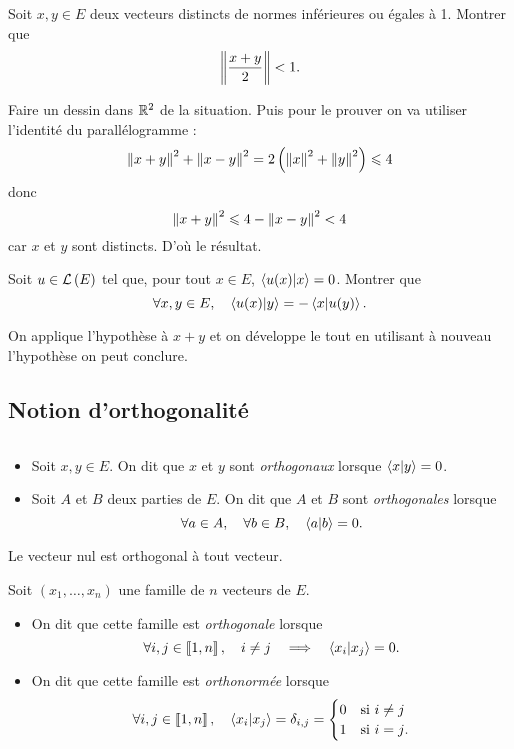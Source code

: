\documentclass{magnolia}
\begin{document}
\begin{exos}
\exo Soit $x,y\in E$ deux vecteurs distincts de normes inférieures ou égales
  à 1. Montrer que
  \[\left\|\frac{x+y}{2}\right\|<1.\]
  \begin{sol}
  Faire un dessin dans $\mathbb{R}^2$ de la situation. Puis pour le prouver on va utiliser l'identité du parallélogramme :
  $$\left\|x+y\right\|^2+\left\|x-y\right\|^2=
  2\left(\left\|x\right\|^2+\left\|y\right\|^2\right)\leqslant 4$$ donc $$\left\|x+y\right\|^2\leqslant 4-\left\|x-y\right\|^2<4$$ car $x$ et $y$ sont distincts. D'où le résultat.
  \end{sol}
\exo Soit $u\in\mathcal{L}\left(E\right)$ tel que, pour tout $x\in E$, $\left\langle {u(x)}\middle|{x}\right\rangle=0$.
  Montrer que
  \[\forall x,y\in E ,\quad \left\langle {u(x)}\middle|{y}\right\rangle=-\left\langle {x}\middle|{u(y)}\right\rangle.\]
  \begin{sol} On applique l'hypothèse à $x+y$ et on développe le tout en utilisant à nouveau l'hypothèse on peut conclure.
  \end{sol}
\end{exos}

\subsection{Notion d'orthogonalité}

\begin{definition}[utile=-3]
$\quad$
\begin{itemize}
\item Soit $x,y\in E$. On dit que $x$ et $y$ sont \emph{orthogonaux} lorsque
  $\left\langle {x}\middle|{y}\right\rangle=0$.
\item Soit $A$ et $B$ deux parties de $E$. On dit que $A$ et $B$ sont
  \emph{orthogonales} lorsque
  \[\forall a\in A ,\quad \forall b\in B ,\quad \left\langle {a}\middle|{b}\right\rangle=0.\]
\end{itemize}
\end{definition}

\begin{remarqueUnique}
\remarque Le vecteur nul est orthogonal à tout vecteur.
\end{remarqueUnique}

\begin{definition}[utile=-3]
Soit $(x_1,\ldots,x_n)$ une famille de $n$ vecteurs de $E$.
\begin{itemize}
\item On dit que cette famille est \emph{orthogonale} lorsque
  \[\forall i,j\in\left\llbracket 1,n\right\rrbracket ,\quad i\neq j \quad\Longrightarrow\quad \left\langle {x_i}\middle|{x_j}\right\rangle=0.\]
\item On dit que cette famille est \emph{orthonormée} lorsque
  \[\forall i,j\in\left\llbracket 1,n\right\rrbracket ,\quad \left\langle {x_i}\middle|{x_j}\right\rangle=\delta_{i,j}=
  \begin{cases}
  0 & \text{si $i\neq j$}\\
  1 & \text{si $i=j$.}
  \end{cases}\]
\end{itemize}
\end{definition}
\end{document}
